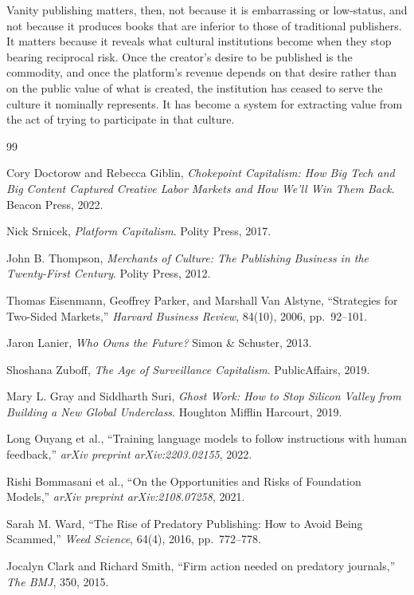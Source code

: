 \documentclass[12pt, a4paper]{article}
\begin{document}
Vanity publishing matters, then, not because it is embarrassing or low-status, and not because it produces books that are inferior to those of traditional publishers. It matters because it reveals what cultural institutions become when they stop bearing reciprocal risk. Once the creator's desire to be published is the commodity, and once the platform's revenue depends on that desire rather than on the public value of what is created, the institution has ceased to serve the culture it nominally represents. It has become a system for extracting value from the act of trying to participate in that culture.

\newpage

\begin{thebibliography}{99}

Cory Doctorow and Rebecca Giblin,
\textit{Chokepoint Capitalism: How Big Tech and Big Content Captured Creative Labor Markets and How We'll Win Them Back}.
Beacon Press, 2022.

Nick Srnicek,
\textit{Platform Capitalism}.
Polity Press, 2017.

John B. Thompson,
\textit{Merchants of Culture: The Publishing Business in the Twenty-First Century}.
Polity Press, 2012.

Thomas Eisenmann, Geoffrey Parker, and Marshall Van Alstyne,
``Strategies for Two-Sided Markets,''
\textit{Harvard Business Review}, 84(10), 2006, pp.~92--101.

Jaron Lanier,
\textit{Who Owns the Future?}
Simon \& Schuster, 2013.

Shoshana Zuboff,
\textit{The Age of Surveillance Capitalism}.
PublicAffairs, 2019.

Mary L. Gray and Siddharth Suri,
\textit{Ghost Work: How to Stop Silicon Valley from Building a New Global Underclass}.
Houghton Mifflin Harcourt, 2019.

Long Ouyang et al.,
``Training language models to follow instructions with human feedback,''
\textit{arXiv preprint arXiv:2203.02155}, 2022.

Rishi Bommasani et al.,
``On the Opportunities and Risks of Foundation Models,''
\textit{arXiv preprint arXiv:2108.07258}, 2021.

Sarah M. Ward,
``The Rise of Predatory Publishing: How to Avoid Being Scammed,''
\textit{Weed Science}, 64(4), 2016, pp.~772--778.

Jocalyn Clark and Richard Smith,
``Firm action needed on predatory journals,''
\textit{The BMJ}, 350, 2015.

\end{thebibliography}
\end{document}
